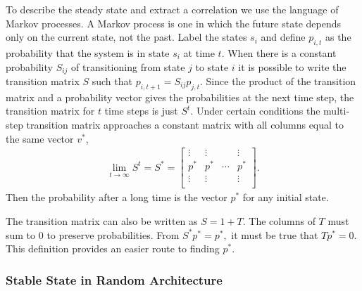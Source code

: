 To describe the steady state and extract a correlation we use the language of Markov processes. A Markov process is one in which the future state depends only on the current state, not the past. Label the states $s_i$ and define $p_{i,t}$ as the probability that the system is in state $s_i$ at time $t$. When there is a constant probability $S_{ij}$ of transitioning from state $j$ to state $i$ it is possible to write the transition matrix $S$ such that $p_{i,t+1}= S_{ij}p_{j,t}$. Since the product of the transition matrix and a probability vector gives the probabilities at the next time step, the transition matrix for $t$ time steps is just $S^t$. Under certain conditions the multi-step transition matrix approaches a constant matrix with all columns equal to the same vector $v^*$,
\begin{align}
\lim\limits_{t\to \infty}S^t = S^* = \begin{bmatrix}
\vdots & \vdots &  & \vdots\\
p^* & p^* & \cdots & p^*\\
\vdots & \vdots &  & \vdots\\
\end{bmatrix}.
\end{align}
Then the probability after a long time is the vector $p^*$ for any initial state.

The transition matrix can also be written as $S = 1+T$. The columns of $T$ must sum to 0 to preserve probabilities. From $S^*p^* = p^*,$ it must be true that $Tp^*=0$. This definition provides an easier route to finding $p^*$.

\subsubsection{Stable State in Random Architecture}  \label{subsub:randstate}

